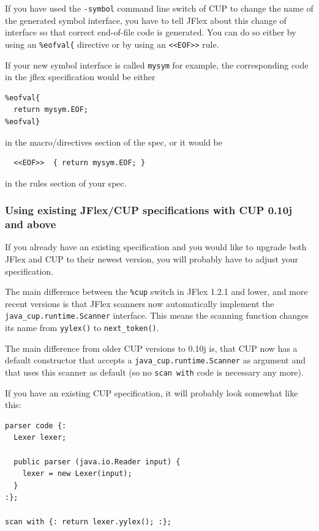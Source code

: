 If you have used the \texttt{-symbol} command line switch of CUP to
change the name of the generated symbol interface, you have to tell
JFlex about this change of interface so that correct end-of-file code is
generated. You can do so either by using an \texttt{\%eofval\{}
directive or by using an
\texttt{\textless{}\textless{}EOF\textgreater{}\textgreater{}} rule.

If your new symbol interface is called \texttt{mysym} for example, the
corresponding code in the jflex specification would be either

\begin{verbatim}
%eofval{
  return mysym.EOF;
%eofval}
\end{verbatim}

in the macro/directives section of the spec, or it would be

\begin{verbatim}
  <<EOF>>  { return mysym.EOF; }
\end{verbatim}

in the rules section of your spec.

\subsubsection{Using existing JFlex/CUP specifications with CUP 0.10j
and
above}\label{using-existing-jflexcup-specifications-with-cup-0.10j-and-above}

If you already have an existing specification and you would like to
upgrade both JFlex and CUP to their newest version, you will probably
have to adjust your specification.

The main difference between the \texttt{\%cup} switch in JFlex 1.2.1 and
lower, and more recent versions is that JFlex scanners now automatically
implement the \texttt{java\_cup.runtime.Scanner} interface. This means
the scanning function changes its name from \texttt{yylex()} to
\texttt{next\_token()}.

The main difference from older CUP versions to 0.10j is, that CUP now
has a default constructor that accepts a
\texttt{java\_cup.runtime.Scanner} as argument and that uses this
scanner as default (so no \texttt{scan\ with} code is necessary any
more).

If you have an existing CUP specification, it will probably look
somewhat like this:

\begin{verbatim}
parser code {:
  Lexer lexer;

  public parser (java.io.Reader input) {
    lexer = new Lexer(input);
  }
:};

scan with {: return lexer.yylex(); :};
\end{verbatim}

